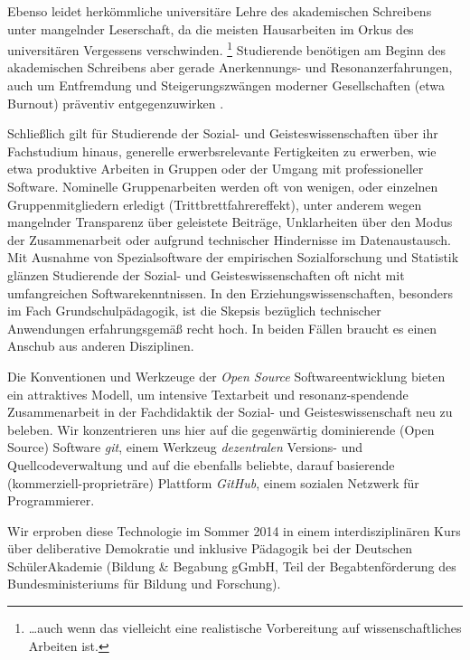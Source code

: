 \documentclass
	[
		11pt,
		a4paper,
		oneside,
		ngerman
	]
	{article}
\begin{document}
Ebenso leidet herkömmliche universitäre Lehre des akademischen Schreibens unter mangelnder Leserschaft, da die meisten Hausarbeiten im Orkus des universitären Vergessens verschwinden.
\footnote{
	\ldots auch wenn das vielleicht eine realistische Vorbereitung auf wissenschaftliches Arbeiten ist.
}
Studierende benötigen am Beginn des akademischen Schreibens aber gerade Anerkennungs- und Resonanzerfahrungen, auch um Entfremdung und Steigerungszwängen moderner Gesell\-schaften (etwa Burnout) präventiv entgegenzuwirken \parencite{Rosa-Paech-etal-2014}.

Schließlich gilt für Studierende der Sozial- und Geisteswissenschaften über ihr Fachstudium hinaus, generelle erwerbsrelevante Fertigkeiten zu erwerben, wie etwa produktive Arbeiten in Gruppen oder der Umgang mit professioneller Software.
Nominelle Gruppenarbeiten werden oft von wenigen, oder einzelnen Gruppenmitgliedern erledigt (Trittbrettfahrereffekt), unter anderem wegen mangelnder Transparenz über geleistete Beiträge, Unklarheiten über den Modus der Zusammenarbeit oder aufgrund technischer Hindernisse im Datenaustausch.
Mit Ausnahme von Spezialsoftware der empirischen Sozialforschung und Statistik glänzen Studierende der Sozial- und Geisteswissenschaften oft nicht mit umfangreichen Softwarekenntnissen.
In den Erziehungswissenschaften, besonders im Fach Grundschulpädagogik, ist die Skepsis bezüglich technischer Anwendungen erfahrungsgemäß recht hoch.
In beiden Fällen braucht es einen Anschub aus anderen Disziplinen.

Die Konventionen und Werkzeuge der \emph{Open Source} Softwareentwicklung bieten ein attraktives Modell, um intensive Textarbeit und resonanz-spendende  Zusammenarbeit in der Fachdidaktik der Sozial- und Geisteswissenschaft neu zu beleben.
Wir konzentrieren uns hier auf die gegenwärtig dominierende  (Open Source) Software \emph{git}, einem Werkzeug \emph{dezentralen} Versions- und Quellcodeverwaltung und auf die ebenfalls beliebte, darauf basierende (kommerziell-proprieträre) Plattform \emph{GitHub}, einem sozialen Netzwerk für Programmierer.

Wir erproben diese Technologie im Sommer 2014 in einem interdisziplinären Kurs über deliberative Demokratie und inklusive Pädagogik bei der Deutschen SchülerAkademie (Bildung \& Begabung gGmbH, Teil der Begabtenförderung des Bundesministeriums für Bildung und Forschung).
\end{document}
